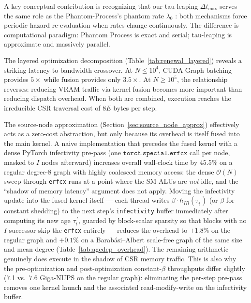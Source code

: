 \documentclass[a4paper,fleqn]{cas-sc}
\theoremstyle{definition}
\theoremstyle{remark}
\newcommand{\bigO}{\mathcal{O}}
\begin{document}
A key conceptual contribution is recognizing that our tau-leaping $\Delta t_{\max}$ serves the same role as the Phantom-Process's phantom rate $\lambda_0$ \citep{vajdi2020stochastic}: both mechanisms force periodic hazard re-evaluation when rates change continuously. The difference is computational paradigm: Phantom Process is exact and serial; tau-leaping is approximate and massively parallel.

The layered optimization decomposition (Table~\ref{tab:renewal_layered}) reveals a striking latency-to-bandwidth crossover. At $N \leq 10^4$, CUDA Graph batching provides $5\times$ while fusion provides only $3.5\times$. At $N \geq 10^5$, the relationship reverses: reducing VRAM traffic via kernel fusion becomes more important than reducing dispatch overhead. When both are combined, execution reaches the irreducible CSR traversal cost of $8E$ bytes per step.

The source-node approximation (Section~\ref{sec:source_node_approx}) effectively acts as a zero-cost abstraction, but only because its overhead is itself fused into the main kernel. A naive implementation that precedes the fused kernel with a dense PyTorch infectivity pre-pass (one $\texttt{torch.special.erfcx}$ call per node, masked to $I$ nodes afterward) increases overall wall-clock time by $45.5\%$ on a regular degree-8 graph with highly coalesced memory access: the dense $\bigO(N)$ sweep through \texttt{erfcx} runs at a point where the SM ALUs are \emph{not} idle, and the ``shadow of memory latency'' argument does not apply. Moving the infectivity update into the fused kernel itself --- each thread writes $\beta \cdot h_{IR}(\tau_i^{\,\prime})$ (or $\beta$ for constant shedding) to the next step's \texttt{infectivity} buffer immediately after computing its new age $\tau_i^{\,\prime}$, guarded by block-scalar sparsity so that blocks with no $I$-successor skip the \texttt{erfcx} entirely --- reduces the overhead to $+1.8\%$ on the regular graph and $+0.1\%$ on a Barab\'{a}si--Albert scale-free graph of the same size and mean degree (Table~\ref{tab:agedep_overhead}). The remaining arithmetic genuinely does execute in the shadow of CSR memory traffic. This is also why the pre-optimization and post-optimization constant-$\beta$ throughputs differ slightly (7.1 vs.\ 7.6 Giga-NUPS on the regular graph): eliminating the per-step pre-pass removes one kernel launch and the associated read-modify-write on the infectivity buffer.
\end{document}
